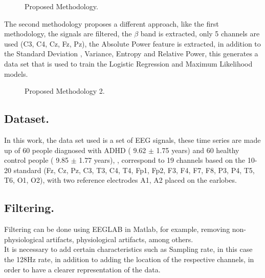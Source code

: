 \documentclass[letterpaper,12pt,openright,oneside]{article}
\begin{document}
\begin{figure}[H]
\centerline{}
\caption{Proposed Methodology.}
\label{diag 1}
\end{figure}

The second methodology proposes a different approach, like the first methodology, the signals are filtered, the $\beta$ band is extracted, only 5 channels are used (C3, C4, Cz, Fz, Pz), the Absolute Power feature is extracted, in addition to the Standard Deviation , Variance, Entropy and Relative Power, this generates a data set that is used to train the Logistic Regression and Maximum Likelihood models.



\begin{figure}[H]
\centerline{}
\caption{Proposed Methodology 2.}
\label{diag 4}
\end{figure}

\pagebreak

\subsection{Dataset.}
In this work, the data set used is a set of EEG signals, these time series are made up of 60 people diagnosed with ADHD ( 9.62 $\pm$ 1.75 years) and 60 healthy control people ( 9.85 $\pm$ 1.77 years),\cite{Xarticle}
 , correspond to 19 channels based on the 10-20 standard (Fz, Cz, Pz, C3, T3, C4, T4, Fp1, Fp2, F3, F4, F7, F8, P3, P4, T5, T6, O1, O2), with two reference electrodes A1, A2 placed on the earlobes. \cite{rzfh} 


\subsection{Filtering.}

Filtering can be done using EEGLAB in Matlab, for example, removing non-physiological artifacts, physiological artifacts, among others.\\

It is necessary to add certain characteristics such as Sampling rate, in this case the 128Hz rate, in addition to adding the location of the respective channels, in order to have a clearer representation of the data.\\



\end{document}
